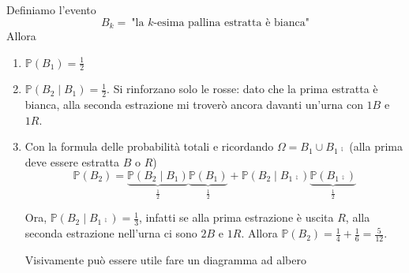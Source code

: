 Definiamo l'evento
\begin{equation*}
B_{k} =\ \text{"la } k\text{-esima pallina estratta è bianca"}
\end{equation*}
Allora
\begin{enumerate}
\item $\mathbb{P}( B_{1}) =\frac{1}{2}$
\item $\mathbb{P}( B_{2} \mid B_{1}) =\frac{1}{2}$. Si rinforzano solo le rosse: dato che la prima estratta è bianca, alla seconda estrazione mi troverò ancora davanti un'urna con $1B$ e $1R$.
\item Con la formula delle probabilità totali e ricordando $\Omega =B_{1} \cup B_{1}\comp$ (alla prima deve essere estratta $B$ o $R$)\begin{equation*}
\mathbb{P}( B_{2}) =\underbrace{\mathbb{P}( B_{2} \mid B_{1})}_{\frac{1}{2}}\underbrace{\mathbb{P}( B_{1})}_{\frac{1}{2}} +\mathbb{P}\left( B_{2} \mid B_{1}\comp\right)\underbrace{\mathbb{P}\left( B_{1}\comp\right)}_{\frac{1}{2}}
\end{equation*}

Ora, $\mathbb{P}\left( B_{2} \mid B_{1}\comp\right) =\frac{1}{3}$, infatti se alla prima estrazione è uscita $R$, alla seconda estrazione nell'urna ci sono $2B$ e $1R$. Allora $\mathbb{P}( B_{2}) =\frac{1}{4} +\frac{1}{6} =\frac{5}{12}$.

Visivamente può essere utile fare un diagramma ad albero


\end{enumerate}
